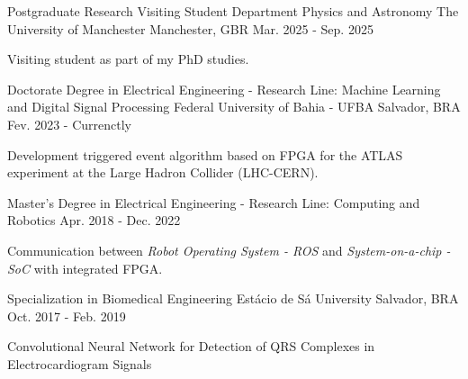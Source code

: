 

\begin{cventries}
  \cventry
    {Postgraduate Research Visiting Student Department Physics and Astronomy} %
    {The University of Manchester} %
    {Manchester, GBR} %
    {Mar. 2025 - Sep. 2025} %
    {
      \begin{cvitems} %
        \item {Visiting student as part of my PhD studies.}
      \end{cvitems}
    }


  \cventry
    {Doctorate Degree in Electrical Engineering - Research Line: Machine Learning and Digital Signal Processing} %
    {Federal University of Bahia - UFBA} %
    {Salvador, BRA} %
    {Fev. 2023 - Currenctly} %
    {
      \begin{cvitems} %
        \item {Development triggered event algorithm based on FPGA for the ATLAS experiment at the Large Hadron Collider (LHC-CERN).}
      \end{cvitems}
    }


  \cventry
    {Master's Degree in Electrical Engineering - Research Line: Computing and Robotics} %
    {} %
    {} %
    {Apr. 2018 - Dec. 2022} %
    {
      \begin{cvitems} %
        \item {Communication between \textit{Robot Operating System - ROS} and \textit{System-on-a-chip - SoC} with integrated FPGA.}
      \end{cvitems}
    }


  \cventry
    {Specialization in Biomedical Engineering} %
    {Estácio de Sá University} %
    {Salvador, BRA} %
    {Oct. 2017 - Feb. 2019} %
    {
      \begin{cvitems} %
        \item {Convolutional Neural Network for Detection of QRS Complexes in Electrocardiogram Signals}
      \end{cvitems}
    }



\end{cventries}
